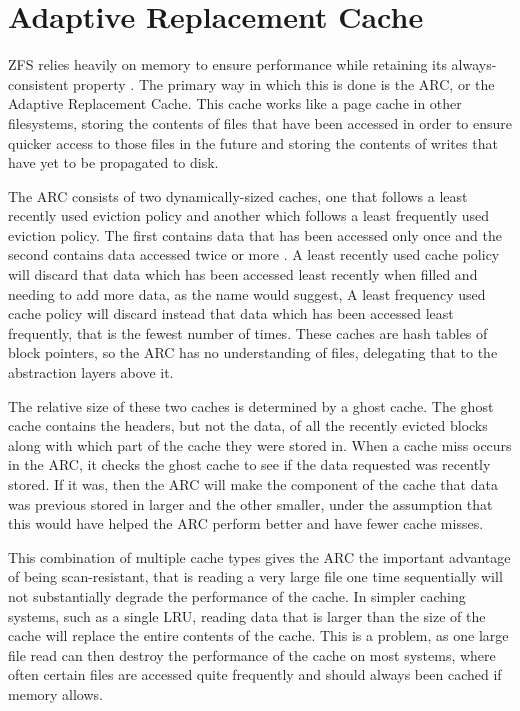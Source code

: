\section{Adaptive Replacement Cache}
\label{chapter:ARC}
ZFS relies heavily on memory to ensure performance while retaining its always-consistent property \cite{ahrens_read_write}.
The primary way in which this is done is the ARC, or the Adaptive Replacement Cache. 
This cache works like a page cache in other filesystems, storing the contents of files that have been accessed
in order to ensure quicker access to those files in the future and storing the contents of writes that have yet to be
propagated to disk.

The ARC consists of two dynamically-sized caches, one that follows a least recently used eviction policy 
and another which follows a least frequently used eviction policy.
The first contains data that has been accessed only once and the second contains data accessed twice or more \cite{megiddo_dharmendra_ARC}.
A least recently used cache policy will discard that data which has been accessed least recently
when filled and needing to add more data, as the name would suggest, 
A least frequency used cache policy will discard instead that data which has been accessed least frequently, 
that is the fewest number of times.
These caches are hash tables of block pointers, so the ARC has no understanding of files, 
delegating that to the abstraction layers above it.

The relative size of these two caches is determined by a ghost cache. 
The ghost cache contains the headers, but not the data, of all the recently evicted blocks
along with which part of the cache they were stored in.
When a cache miss occurs in the ARC, it checks the ghost cache to see if the data requested was recently stored.
If it was, then the ARC will make the component of the cache that data was previous stored in larger and the other smaller,
under the assumption that this would have helped the ARC perform better and have fewer cache misses.

This combination of multiple cache types gives the ARC the important advantage of being scan-resistant,
that is reading a very large file one time sequentially will not substantially degrade the performance of the cache.
In simpler caching systems, such as a single LRU, reading data that is larger than the size of the cache will replace the entire
contents of the cache.
This is a problem, as one large file read can then destroy the performance of the cache on most systems,
where often certain files are accessed quite frequently and should always been cached if memory allows.

